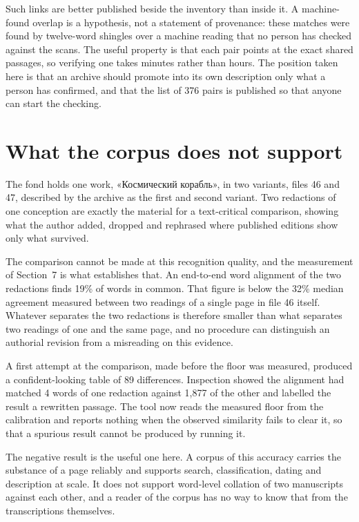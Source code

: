 \documentclass[11pt,a4paper]{article}
\begin{document}
Such links are better published beside the inventory than inside it. A
machine-found overlap is a hypothesis, not a statement of provenance: these
matches were found by twelve-word shingles over a machine reading that no
person has checked against the scans. The useful property is that each pair
points at the exact shared passages, so verifying one takes minutes rather
than hours. The position taken here is that an archive should promote into its
own description only what a person has confirmed, and that the list of 376
pairs is published so that anyone can start the checking.

\section{What the corpus does not support}\label{what-the-corpus-does-not-support}

The fond holds one work, «Космический корабль», in two variants, files 46 and
47, described by the archive as the first and second variant. Two redactions
of one conception are exactly the material for a text-critical comparison,
showing what the author added, dropped and rephrased where published editions
show only what survived.

The comparison cannot be made at this recognition quality, and the measurement
of Section~7 is what establishes that. An end-to-end word alignment of the two
redactions finds 19\% of words in common. That figure is below the 32\% median
agreement measured between two readings of a single page in file 46 itself.
Whatever separates the two redactions is therefore smaller than what separates
two readings of one and the same page, and no procedure can distinguish an
authorial revision from a misreading on this evidence.

A first attempt at the comparison, made before the floor was measured,
produced a confident-looking table of 89 differences. Inspection showed the
alignment had matched 4 words of one redaction against 1,877 of the other and
labelled the result a rewritten passage. The tool now reads the measured floor
from the calibration and reports nothing when the observed similarity fails to
clear it, so that a spurious result cannot be produced by running it.

The negative result is the useful one here. A corpus of this accuracy carries
the substance of a page reliably and supports search, classification, dating
and description at scale. It does not support word-level collation of two
manuscripts against each other, and a reader of the corpus has no way to know
that from the transcriptions themselves.
\end{document}
